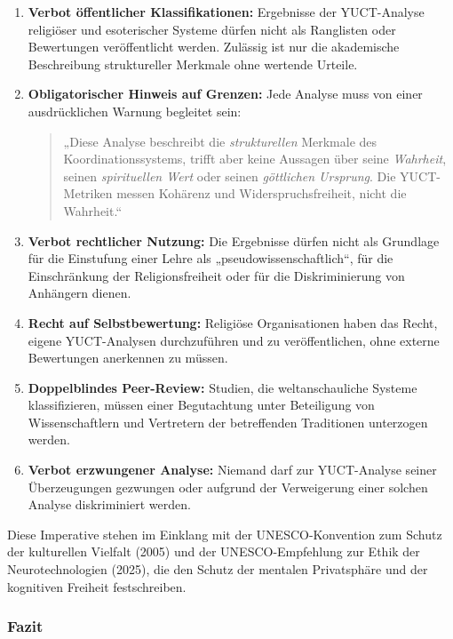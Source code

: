 \documentclass[12pt,a4paper]{article}
\begin{document}
	\begin{enumerate}[label=(\arabic*)]
		\item \textbf{Verbot öffentlicher Klassifikationen:} Ergebnisse der YUCT-Analyse religiöser und esoterischer Systeme dürfen nicht als Ranglisten oder Bewertungen veröffentlicht werden. Zulässig ist nur die akademische Beschreibung struktureller Merkmale ohne wertende Urteile.
		
		\item \textbf{Obligatorischer Hinweis auf Grenzen:} Jede Analyse muss von einer ausdrücklichen Warnung begleitet sein:
		\begin{quote}
			„Diese Analyse beschreibt die \emph{strukturellen} Merkmale des Koordinationssystems, trifft aber keine Aussagen über seine \emph{Wahrheit}, seinen \emph{spirituellen Wert} oder seinen \emph{göttlichen Ursprung}. Die YUCT-Metriken messen Kohärenz und Widerspruchsfreiheit, nicht die Wahrheit.“
		\end{quote}
		
		\item \textbf{Verbot rechtlicher Nutzung:} Die Ergebnisse dürfen nicht als Grundlage für die Einstufung einer Lehre als „pseudowissenschaftlich“, für die Einschränkung der Religionsfreiheit oder für die Diskriminierung von Anhängern dienen.
		
		\item \textbf{Recht auf Selbstbewertung:} Religiöse Organisationen haben das Recht, eigene YUCT-Analysen durchzuführen und zu veröffentlichen, ohne externe Bewertungen anerkennen zu müssen.
		
		\item \textbf{Doppelblindes Peer-Review:} Studien, die weltanschauliche Systeme klassifizieren, müssen einer Begutachtung unter Beteiligung von Wissenschaftlern und Vertretern der betreffenden Traditionen unterzogen werden.
		
		\item \textbf{Verbot erzwungener Analyse:} Niemand darf zur YUCT-Analyse seiner Überzeugungen gezwungen oder aufgrund der Verweigerung einer solchen Analyse diskriminiert werden.
	\end{enumerate}
	
	Diese Imperative stehen im Einklang mit der UNESCO-Konvention zum Schutz der kulturellen Vielfalt (2005) und der UNESCO-Empfehlung zur Ethik der Neurotechnologien (2025), die den Schutz der mentalen Privatsphäre und der kognitiven Freiheit festschreiben.
	
	\subsubsection{Fazit}
	
\end{document}
